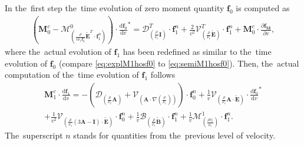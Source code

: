 \documentclass[review]{elsarticle}
\newcommand{\pdv}[2]{\frac{\partial{#1}}{\partial{#2}}}
\newcommand{\vect}[1]{\boldsymbol{#1}}
\newcommand{\matr}[1]{\mathbf{#1}}
\newcommand{\dI}{\text{d}}
\newcommand{\odv}[2]{\frac{\dI #1}{\dI #2}}
\newcommand{\ddv}[2]{\odv{#1}{#2}}
\newcommand{\nue}{\nu_{e}}
\newcommand{\nutot}{\nu_{t}}
\newcommand{\vmag}{v}
\newcommand{\tE}{\vect{\tilde{E}}}
\newcommand{\tB}{\vect{\tilde{B}}}
\newcommand{\fM}{f_M}
\newcommand{\vfzero}{\vect{f}_0}
\newcommand{\fone}{\vect{f}_1}
\newcommand{\MI}{\matr{I}}
\newcommand{\MA}{\matr{A}}
\newcommand{\IM}{\boldsymbol{\mathcal{M}}}
\newcommand{\ID}{\boldsymbol{\mathcal{D}}}
\newcommand{\IV}{\boldsymbol{\mathcal{V}}}
\newcommand{\IB}{\boldsymbol{\mathcal{B}}}
\begin{document}
In the~first step the~time evolution of zero moment quantity $\vfzero$ is 
computed as
\begin{multline}
  \left( \matr{M}^c_0 
  - \IM^0_{\left(\frac{\rho}{\vmag\nue\vfzero^n}\tE^T\cdot\fone^n\right)}
  \right) \cdot {\ddv{\vfzero}{\vmag}}^* 
  = 
  \ID^T_{\left(\frac{\rho}{\nue}\MI\right)} \cdot \fone^n 
  + \frac{2}{\vmag^2}\IV^T_{\left(\frac{\rho}{\nue}\tE\right)} \cdot \fone^n
  + \matr{M}^c_0 \cdot \pdv{\vect{\fM}}{\vmag} ,  
  \label{eq:explM1hosf0}
\end{multline}
where the~actual evolution of $\fone$ has been redefined as similar to 
the~time evolution of $\vfzero$ (compare \eqref{eq:explM1hosf0} to 
\eqref{eq:semiM1hosf0}). Then, the~actual computation of the~time evolution 
of $\fone$ follows
\begin{multline}
  \matr{M}^c_1 \cdot \ddv{\fone}{\vmag} 
  = 
  - \left(\ID_{\left(\frac{\rho}{\nue}\MA\right)}  
  + \IV_{\left( \MA \cdot \nabla\left(\frac{\rho}{\nue}\right) \right)} \right) 
  \cdot \vfzero^n  
  + \frac{1}{\vmag}\IV_{\left(\frac{\rho}{\nue}\MA \cdot \tE\right)} \cdot
  {\ddv{\vfzero}{\vmag}}^* \\
  + \frac{1}{\vmag^2}\IV_{\left(\frac{\rho}{\nue} 
  \left( 3\MA - \MI \right) \cdot \tE \right)} \cdot \vfzero^n
  + \frac{1}{\vmag}\IB_{\left( \frac{\rho}{\nue}\tB \right)} \cdot \fone^n
  + \frac{1}{\vmag}\IM^1_{\left( \frac{\rho \nutot}{\nue} \right)} 
  \cdot \fone^n .
  \label{eq:explM1hosf1}
\end{multline}
The~superscript $n$ stands for quantities from the~previous level of velocity.
\end{document}
